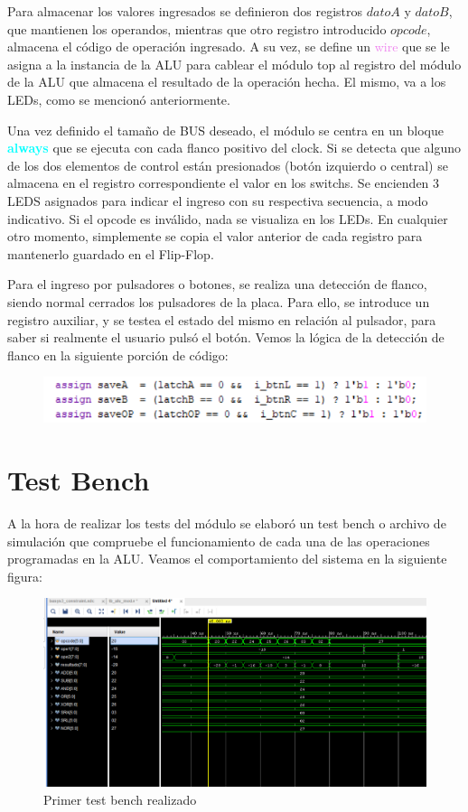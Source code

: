 \documentclass[paper=letter, fontsize=12pt]{article}
\begin{document}
Para almacenar los valores ingresados se definieron dos registros $datoA$ y $datoB$, que mantienen los operandos, mientras que otro registro introducido $opcode$, almacena el código de operación ingresado. 
A su vez, se define un \textcolor{violet}{wire} que se le asigna a la instancia de la ALU para cablear el módulo top al registro del módulo de la ALU que almacena el resultado de la operación hecha.
El mismo, va a los LEDs, como se mencionó anteriormente.

Una vez definido el tamaño de BUS deseado, el módulo se centra en un bloque \textbf{\textcolor{cyan}{always}} que se ejecuta con cada flanco positivo del clock. Si se detecta que alguno de los dos elementos de
control están presionados (botón izquierdo o central) se almacena en el registro correspondiente el valor en los switchs.
Se encienden 3 LEDS asignados para indicar el ingreso con su respectiva secuencia, a modo indicativo.
Si el opcode es inválido, nada se visualiza en los LEDs. 
En cualquier otro momento, simplemente se copia el valor anterior de cada registro para mantenerlo guardado en el Flip-Flop.

Para el ingreso por pulsadores o botones, se realiza una detección de flanco, siendo normal cerrados los pulsadores de la placa. Para ello, se introduce un registro auxiliar, y se
testea el estado del mismo en relación al pulsador, para saber si realmente el usuario pulsó el botón. Vemos la lógica de la detección de flanco en la siguiente porción de código:
\begin{figure}[H]
\centering
\includegraphics[scale=0.6]{buttons.png}
\end{figure}

\section{Test Bench}

A la hora de realizar los tests del módulo se elaboró un test bench o archivo de simulación que compruebe el funcionamiento de cada una de las operaciones programadas en la ALU.
Veamos el comportamiento del sistema en la siguiente figura:
\begin{figure}[H]
\centering
\includegraphics[scale=0.6]{testbench1.png}
\caption{Primer test bench realizado}
\end{figure}
\end{document}
